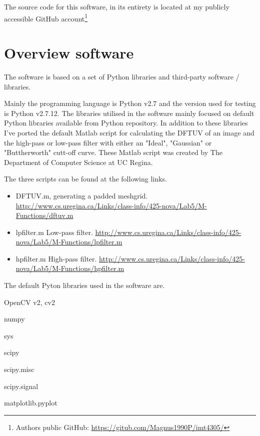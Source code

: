 The source code for this software, in its entirety is located at my publicly
accessible GitHub account\footnote{Authors public GitHub:
\url{https://gitub.com/Magnus1990P/imt4305/}}


\section{Overview software}
The software is based on a set of Python libraries and third-party software /
libraries.

Mainly the programming language is Python v2.7 and the version used for testing
is Python v2.7.12. The libraries utilised in the software mainly focused on
default Python libraries available from Python repository. In addition to these
libraries I've ported the default Matlab script for calculating the DFTUV of an
image and the high-pass or low-pass filter with either an "Ideal", "Gaussian" or
"Buttherworth" cutt-off curve. These Matlab script was created by The Department
of Computer Science at UC Regina.

The three scripts can be found at the following links.
\begin{itemize}
	\item DFTUV.m, generating a padded meshgrid.
		\url{http://www.cs.uregina.ca/Links/class-info/425-nova/Lab5/M-Functions/dftuv.m}
	\item lpfilter.m Low-pass filter.
		\url{http://www.cs.uregina.ca/Links/class-info/425-nova/Lab5/M-Functions/lpfilter.m}
	\item hpfilter.m High-pass filter.
		\url{http://www.cs.uregina.ca/Links/class-info/425-nova/Lab5/M-Functions/hpfilter.m}
\end{itemize}

The default Pyton libraries used in the software are.
\begin{itemize}
\begin{multicols}{3}
	\item OpenCV v2, cv2
	\item numpy
	\item sys
	\item scipy
	\item scipy.misc
	\item scipy.signal
	\item matplotlib.pyplot
\end{multicols}
\end{itemize}


